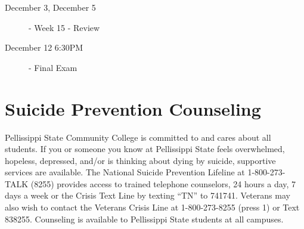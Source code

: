 \documentclass{article}
\begin{document}
\begin{description}
    \item[December 3, December 5] - Week 15 - Review
    \item[December 12 6:30PM] - Final Exam
\end{description}

\hrulefill

\section{Suicide Prevention Counseling}
Pellissippi State Community College is committed to and cares about
all students. If you or someone you know at Pellissippi State feels
overwhelmed, hopeless, depressed, and/or is thinking about dying by
suicide, supportive services are available. The National Suicide
Prevention Lifeline at 1-800-273-TALK (8255) provides access to
trained telephone counselors, 24 hours a day, 7 days a week or the
Crisis Text Line by texting ``TN'' to 741741. Veterans may also wish
to contact the Veterans Crisis Line at 1-800-273-8255 (press 1) or
Text 838255. Counseling is available to Pellissippi State students at
all campuses.
\end{document}
